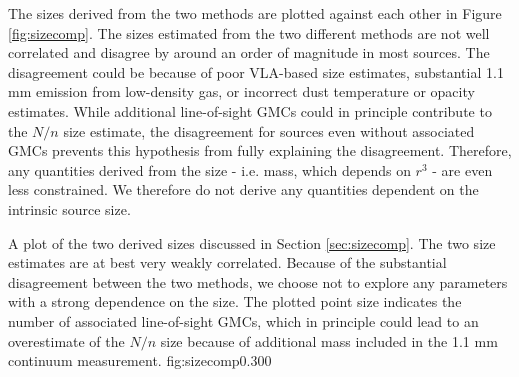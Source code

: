 The sizes derived from the two methods are plotted against each other in Figure
\ref{fig:sizecomp}.  The sizes estimated from the two different methods are not
well correlated and disagree by around an order of magnitude in most sources.
The disagreement could be because of poor VLA-based size estimates, substantial
1.1 mm emission from low-density gas, or incorrect dust temperature or opacity
estimates.  While additional line-of-sight GMCs could in principle contribute
to the $N/n$ size estimate, the disagreement for sources even without
associated GMCs prevents this hypothesis from fully explaining the
disagreement.  Therefore, any quantities derived from the size - i.e.
mass, which depends on $r^3$ - are even less constrained.  We therefore do not
derive any quantities dependent on the intrinsic source size.

{A plot of the two derived sizes discussed in Section \ref{sec:sizecomp}.  The
two size estimates are at best very weakly correlated.  Because of the
substantial disagreement between the two methods, we choose not to explore any
parameters with a strong dependence on the size.  The plotted point size
indicates the number of associated line-of-sight GMCs, which in principle could
lead to an overestimate of the $N/n$ size because of additional mass included in
the 1.1 mm continuum measurement.}
{fig:sizecomp}{0.30}{0}




